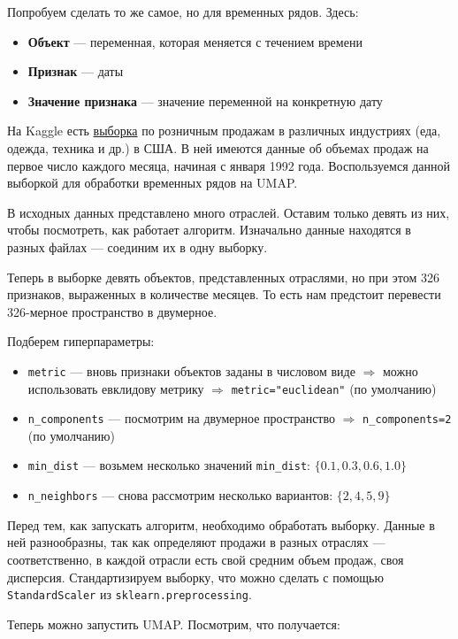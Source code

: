 \graphicspath{{times/}}
Попробуем сделать то же самое, но для временных рядов. Здесь:
\begin{itemize}
	\item \textbf{Объект} --- переменная, которая меняется с течением времени
	\item \textbf{Признак} --- даты
	\item \textbf{Значение признака} --- значение переменной на конкретную дату
\end{itemize}

На Kaggle есть \href{https://www.kaggle.com/census/advance-retail-sales-time-series-collection}{выборка} по розничным продажам в различных индустриях (еда, одежда, техника и др.) в США. В ней имеются данные об объемах продаж на первое число каждого месяца, начиная с января 1992 года. Воспользуемся данной выборкой для обработки временных рядов на UMAP.

В исходных данных представлено много отраслей. Оставим только девять из них, чтобы посмотреть, как работает алгоритм. Изначально данные находятся в разных файлах --- соединим их в одну выборку.

Теперь в выборке девять объектов, представленных отраслями, но при этом 326 признаков, выраженных в количестве месяцев. То есть нам предстоит перевести 326-мерное пространство в двумерное.

Подберем гиперпараметры:
\begin{itemize}
	\item \verb|metric| --- вновь признаки объектов заданы в числовом виде $\Rightarrow$ можно использовать евклидову метрику $\Rightarrow$ \verb|metric="euclidean"| (по умолчанию)
	\item \verb|n_components| --- посмотрим на двумерное пространство $\Rightarrow$ \verb|n_components=2| (по умолчанию)
	\item \verb|min_dist| --- возьмем несколько значений \verb|min_dist|: $\{0.1, 0.3, 0.6, 1.0\}$
	\item \verb|n_neighbors| --- снова рассмотрим несколько вариантов: $\{2, 4, 5, 9\}$
\end{itemize}

Перед тем, как запускать алгоритм, необходимо обработать выборку. Данные в ней разнообразны, так как определяют продажи в разных отраслях --- соответственно, в каждой отрасли есть свой средним объем продаж, своя дисперсия. Стандартизируем выборку, что можно сделать с помощью \verb|StandardScaler| из \verb|sklearn.preprocessing|.

\newpage
Теперь можно запустить UMAP. Посмотрим, что получается:


